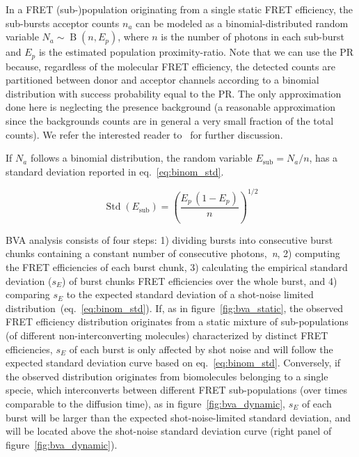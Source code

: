 In a FRET (sub-)population originating from a single static FRET efficiency,
the sub-bursts acceptor counts $n_a$ can be modeled as a binomial-distributed random variable 
$N_a \sim \operatorname{B}(n, E_p)$, where $n$ is the number of photons in each sub-burst and 
$E_p$ is the estimated population proximity-ratio. 
Note that we can use the PR because, regardless of the molecular FRET efficiency, 
the detected counts are partitioned between donor and acceptor channels according to
a binomial distribution with success probability equal to the PR.
The only approximation done here is neglecting the presence background
(a reasonable approximation since the backgrounds counts are in general a 
very small fraction of the total counts). 
We refer the interested reader to~\cite{Torella_2011} for further discussion.

If $N_a$ follows a binomial distribution, the random variable $E_{\textrm{sub}} = N_a/n$,
has a standard deviation reported in eq.~\ref{eq:binom_std}. 

\begin{equation}
\label{eq:binom_std}
\operatorname{Std}(E_{\textrm{sub}}) = \left( \frac{E_p\,(1 - E_p)}{n} \right)^{1/2}
\end{equation}

BVA analysis consists of four steps: 1) dividing bursts into consecutive burst chunks containing a constant number of consecutive photons,~\textit{n}, 2) computing the FRET efficiencies of each burst chunk, 3) calculating the empirical standard deviation ($s_E$) of burst chunks FRET efficiencies over the whole burst, and 4) comparing $s_E$ to the expected standard deviation of a shot-noise limited distribution~(eq.~\ref{eq:binom_std}).
If, as in figure~\ref{fig:bva_static}, the observed FRET efficiency distribution 
originates from a static mixture of sub-populations (of different 
non-interconverting molecules) characterized by distinct FRET efficiencies, 
$s_E$ of each burst is only affected by shot noise and will follow the expected standard deviation curve based on eq.~\ref{eq:binom_std}. 
Conversely, if the observed distribution originates from biomolecules belonging to a single specie, which 
interconverts between different FRET sub-populations (over times comparable to the diffusion 
time), as in figure~\ref{fig:bva_dynamic}, $s_E$ of each burst will be larger than the expected 
shot-noise-limited standard deviation, and will be located above the shot-noise standard 
deviation curve (right panel of figure~\ref{fig:bva_dynamic}).

